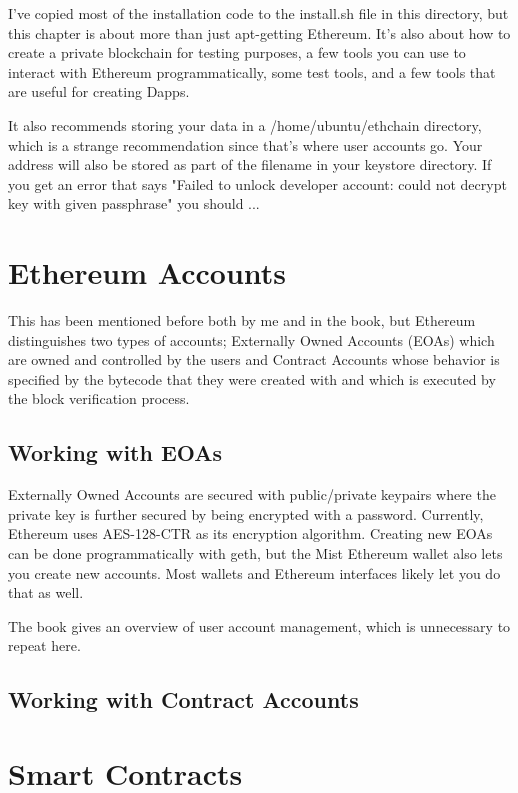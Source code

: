 \documentclass{article}
\begin{document}
I've copied most of the installation code to the install.sh file in this directory, but this chapter is about more than just apt-getting Ethereum. It's also about how to create a private blockchain for testing purposes, a few tools you can use to interact with Ethereum programmatically, some test tools, and a few tools that are useful for creating Dapps.

It also recommends storing your data in a /home/ubuntu/ethchain directory, which is a strange recommendation since that's where user accounts go. Your address will also be stored as part of the filename in your keystore directory. If you get an error that says
"Failed to unlock developer account: could not decrypt key with given passphrase" you should ...


\section{Ethereum Accounts}
This has been mentioned before both by me and in the book, but Ethereum distinguishes two types of accounts; Externally Owned Accounts (EOAs) which are owned and controlled by the users and Contract Accounts whose behavior is specified by the bytecode that they were created with and which is executed by the block verification process.

\subsection{Working with EOAs}
Externally Owned Accounts are secured with public/private keypairs where the private key is further secured by being encrypted with a password. Currently, Ethereum uses AES-128-CTR as its encryption algorithm. Creating new EOAs can be done programmatically with geth, but the Mist Ethereum wallet also lets you create new accounts. Most wallets and Ethereum interfaces likely let you do that as well.

The book gives an overview of user account management, which is unnecessary to repeat here.

\subsection{Working with Contract Accounts}

\section{Smart Contracts}
\end{document}
